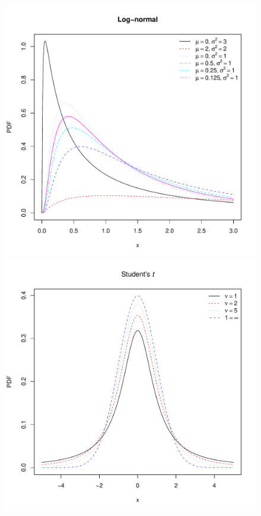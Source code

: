 \documentclass[landscape]{article}
\begin{document}
\begin{figure}[H]
  \includegraphics[scale=0.35]{figs/lognormal.pdf}
  \includegraphics[scale=0.35]{figs/student.pdf}

\end{figure}
\end{document}
